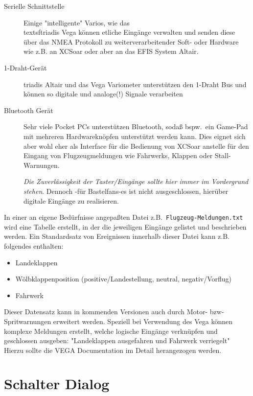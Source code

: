 \begin{description}
     \item[Serielle Schnittstelle]  Einige "intelligente" Varios, wie das \\textsf{triadis Vega} können etliche  Eingänge verwalten und senden diese über das NMEA Protokoll zu weiterverarbeitender Soft- oder Hardware wie z.B. an \textsf{XCSoar} oder aber an das EFIS System \textsf{Altair}.
     \item[1-Draht-Gerät]  \textsf{triadis \textsf{Altair}} und das Vega Variometer unterstützen den 1-Draht Bus und können so digitale und analoge(!) Signale verarbeiten
     \item[Bluetooth Gerät]  Sehr viele Pocket \textsf{PC}s unterstützen Bluetooth, sodaß bspw.\ ein Game-Pad mit mehreren  Hardwareknöpfen unterstützt werden kann. Dies eignet sich aber wohl eher als Interface für die Bedienung von \textsf{XCSoar} anstelle für den Eingang von Flugzeugmeldungen wie Fahrwerks, Klappen oder Stall-Warnungen.

        \textsl{Die Zuverlässigkeit der Taster/Eingänge sollte hier immer im Vordergrund stehen}.
        Dennoch -für Bastelfans-es ist nicht ausgeschlossen, hierüber digitale Eingänge zu realisieren.
\end{description}

In einer an eigene Bedürfnisse angepaßten Datei z.B.\ \texttt{Flugzeug-Meldungen.txt} wird eine Tabelle erstellt, in der die jeweiligen Eingänge gelistet und beschrieben werden. Ein Standardsatz von Ereignissen innerhalb dieser Datei  kann z.B. folgendes enthalten:
\begin{itemize}
\item Landeklappen
\item Wölbklappenposition (positive/Landestellung, neutral, negativ/Vorflug)
\item Fahrwerk
\end{itemize}

\halt Dieser Datensatz kann in kommenden Versionen auch durch Motor- bzw- Spritwarnungen erweitert werden.
Speziell bei Verwendung des Vega können komplexe Meldungen erstellt, welche logische Eingänge verknüpfen und geschlossen ausgeben: "Landeklappen ausgefahren und Fahrwerk verriegelt"  Hierzu sollte die VEGA Documentation im Detail herangezogen werden.

\section{Schalter Dialog}

